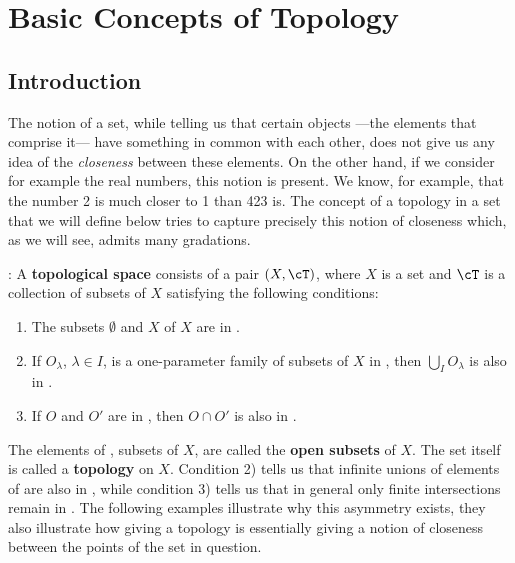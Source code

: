 
%

\chapter{Basic Concepts of Topology}


\section{Introduction}

The notion of a set, while telling us that certain objects ---the elements that comprise it--- have something in common with each other, does not give us any idea of the {\it closeness} between these elements. On the other hand, if we consider for example the real numbers, this notion is present. We know, for example, that the number 2 is much closer to 1 than 423 is. The concept of a topology in a set that we will define below tries to capture precisely this notion of closeness which, as we will see, admits many gradations.

: A {\bf topological space} consists of a pair $(X, \cT)$, where $X$ is a set and $\cT$ is a collection of subsets of $X$ satisfying the following conditions:

\begin{enumerate} \item The subsets $\emptyset$ and $X$ of $X$ are in \cT. \item If $O_{\lambda}$, $\lambda \in I$, is a one-parameter family of subsets of $X$ in \cT, then $\bigcup_I O_{\lambda}$ is also in \cT. \item If $O$ and $O'$ are in \cT, then $O \cap O'$ is also in \cT.

\end{enumerate}

The elements of \cT, subsets of $X$, are called the {\bf open subsets} of $X$. The set \cT itself is called a {\bf topology} on $X$. Condition 2) tells us that infinite unions of elements of \cT are also in \cT, while condition 3) tells us that in general only finite intersections remain in \cT. The following examples illustrate why this asymmetry exists, they also illustrate how giving a topology is essentially giving a notion of closeness between the points of the set in question.

